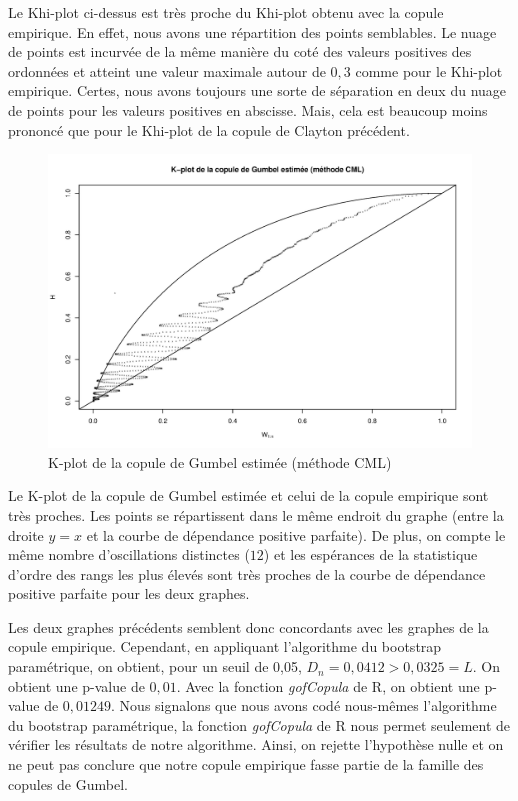 Le Khi-plot ci-dessus est très proche du Khi-plot obtenu avec la copule empirique. En effet, nous avons une répartition des points semblables. Le nuage de points est incurvée de la même manière du coté des valeurs positives des ordonnées et atteint une valeur maximale autour de $0,3$ comme pour le Khi-plot empirique. Certes, nous avons toujours une sorte de séparation en deux du nuage de points pour les valeurs positives en abscisse. Mais, cela est beaucoup moins prononcé que pour le Khi-plot de la copule de Clayton précédent.

\noindent%
\begin{figure}[H]
    \begin{center}
      \includegraphics[width=17 cm, angle=0]{./pictures/gumbelcmlkplot.png}
      \centering\caption{\label{2}K-plot de la copule de Gumbel estimée (méthode CML)}
    \end{center}
\end{figure}

Le K-plot de la copule de Gumbel estimée et celui de la copule empirique sont très proches. Les points se répartissent dans le même endroit du graphe (entre la droite $y=x$ et la courbe de dépendance positive parfaite). De plus, on compte le même nombre d'oscillations distinctes ($12$) et les espérances de la statistique d'ordre des rangs les plus élevés sont très proches de la courbe de dépendance positive parfaite pour les deux graphes. 

Les deux graphes précédents semblent donc concordants avec les graphes de la copule empirique.
Cependant, en appliquant l'algorithme du bootstrap paramétrique, on obtient, pour un seuil de 0,05, $D_n = 0,0412 > 0,0325 = L$. On obtient une p-value de $0,01$. Avec la fonction \textit{gofCopula} de R, on obtient une p-value de $0,01249$. 
Nous signalons que nous avons codé nous-mêmes l'algorithme du bootstrap paramétrique, la fonction \textit{gofCopula} de R nous permet seulement de vérifier les résultats de notre algorithme.
Ainsi, on rejette l'hypothèse nulle et on ne peut pas conclure que notre copule empirique fasse partie de la famille des copules de Gumbel.

